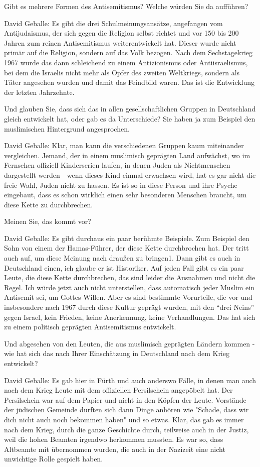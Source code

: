  Gibt es mehrere Formen des Antisemitismus? Welche würden Sie da aufführen? 

David Geballe: Es gibt die drei Schulmeinungsansätze, angefangen vom Antijudaismus, der sich gegen die Religion selbst richtet und vor 150 bis 200 Jahren zum reinen Antisemitismus weiterentwickelt hat. Dieser wurde nicht primär auf die Religion, sondern auf das Volk bezogen. Nach dem Sechstagekrieg 1967 wurde das dann schleichend zu einem Antizionismus oder Antiisraelismus, bei dem die Israelis nicht mehr als Opfer des zweiten Weltkriegs, sondern als Täter angesehen wurden und damit das Feindbild waren. Das ist die Entwicklung der letzten Jahrzehnte. 

 Und glauben Sie, dass sich das in allen gesellschaftlichen Gruppen in Deutschland gleich entwickelt hat, oder gab es da Unterschiede? Sie haben ja zum Beispiel den muslimischen Hintergrund angesprochen. 

David Geballe: Klar, man kann die verschiedenen Gruppen kaum miteinander vergleichen. Jemand, der in einem muslimisch geprägten Land aufwächst, wo im Fernsehen offiziell Kinderserien laufen, in denen Juden als Nichtmenschen dargestellt werden - wenn dieses Kind einmal erwachsen wird, hat es gar nicht die freie Wahl, Juden nicht zu hassen. Es ist so in diese Person und ihre Psyche eingebaut, dass es schon wirklich einen sehr besonderen Menschen braucht, um diese Kette zu durchbrechen. 

 Meinen Sie, das kommt vor? 

David Geballe: Es gibt durchaus ein paar berühmte Beispiele. Zum Beispiel den Sohn von einem der Hamas-Führer, der diese Kette durchbrochen hat. Der tritt auch auf, um diese Meinung nach draußen zu bringen1. Dann gibt es auch in Deutschland einen, ich glaube er ist Historiker. Auf jeden Fall gibt es ein paar Leute, die diese Kette durchbrechen, das sind leider die Ausnahmen und nicht die Regel. Ich würde jetzt auch nicht unterstellen, dass automatisch jeder Muslim ein Antisemit sei, um Gottes Willen. Aber es sind bestimmte Vorurteile, die vor und insbesondere nach 1967 durch diese Kultur geprägt wurden, mit den “drei Neins” gegen Israel, kein Frieden, keine Anerkennung, keine Verhandlungen. Das hat sich zu einem politisch geprägten Antisemitismus entwickelt. 

Und abgesehen von den Leuten, die aus muslimisch geprägten Ländern kommen - wie hat sich das nach Ihrer Einschätzung in Deutschland nach dem Krieg entwickelt? 

David Geballe: Es gab hier in Fürth und auch anderswo Fälle, in denen man auch nach dem Krieg Leute mit dem offiziellen Persilschein angepöbelt hat. Der Persilschein war auf dem Papier und nicht in den Köpfen der Leute. Vorstände der jüdischen Gemeinde durften sich dann Dinge anhören wie "Schade, dass wir dich nicht auch noch bekommen haben" und so etwas. Klar, das gab es immer nach dem Krieg, durch die ganze Geschichte durch, teilweise auch in der Justiz, weil die hohen Beamten irgendwo herkommen mussten. Es war so, dass Altbeamte mit übernommen wurden, die auch in der Nazizeit eine nicht unwichtige Rolle gespielt haben. 

